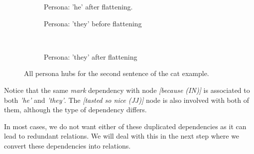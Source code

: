 \begin{figure}[H]
\begin{subfigure}[t]{0.9\textwidth}
\begin{tikzpicture}[->, node distance=3cm,main node/.style={circle, draw, font=\sffamily\bfseries}]
        \end{tikzpicture}
    \caption{Persona: 'he' after flattening.}
\end{subfigure}
\begin{subfigure}[t]{0.45\textwidth}
	\centering
    \caption{Persona: 'they' before flattening}
\end{subfigure}
~
\begin{subfigure}[t]{0.45\textwidth}
	\centering
    \caption{Persona: 'they' after flattening}
\end{subfigure}
\caption{All persona hubs for the second sentence of the cat example.}
\label{fig:second-hubs}
\end{figure}

Notice that the same \textit{mark} dependency with node \textit{[because (IN)]} is associated to both \textit{'he'} and \textit{'they'}. The \textit{[tasted so nice (JJ)]} node is also involved with both of them, although the type of dependency differs.

In most cases, we do not want either of these duplicated dependencies as it can lead to redundant relations. We will deal with this in the next step where we convert these dependencies into relations.

